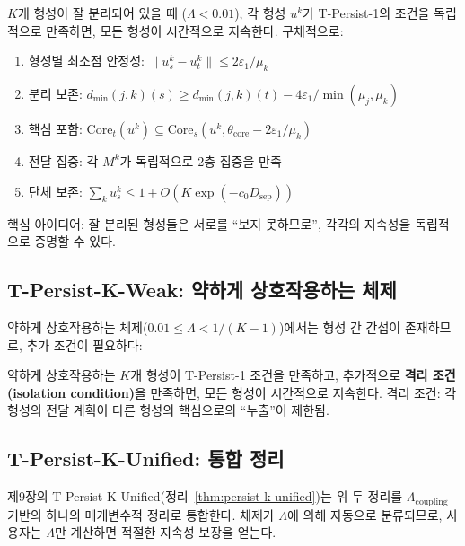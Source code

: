 \begin{theorem}
\label{thm:persist-k-sep}
$K$개 형성이 잘 분리되어 있을 때 ($\Lambda < 0.01$), 각 형성 $u^k$가 T-Persist-1의 조건을 독립적으로 만족하면, 모든 형성이 시간적으로 지속한다. 구체적으로:
\begin{enumerate}
    \item[(a)] 형성별 최소점 안정성: $\|u^k_s - u^k_t\| \leq 2\varepsilon_1/\mu_k$
    \item[(b)] 분리 보존: $d_{\min}(j,k)(s) \geq d_{\min}(j,k)(t) - 4\varepsilon_1/\min(\mu_j, \mu_k)$
    \item[(c)] 핵심 포함: $\mathrm{Core}_t(u^k) \subseteq \mathrm{Core}_s(u^k, \theta_{\mathrm{core}} - 2\varepsilon_1/\mu_k)$
    \item[(d)] 전달 집중: 각 $M^k$가 독립적으로 2층 집중을 만족
    \item[(e)] 단체 보존: $\sum_k u^k_s \leq 1 + O(K \exp(-c_0 D_{\mathrm{sep}}))$
\end{enumerate}
\end{theorem}

핵심 아이디어: 잘 분리된 형성들은 서로를 ``보지 못하므로'', 각각의 지속성을 독립적으로 증명할 수 있다.

\subsection{T-Persist-K-Weak: 약하게 상호작용하는 체제}

약하게 상호작용하는 체제($0.01 \leq \Lambda < 1/(K-1)$)에서는 형성 간 간섭이 존재하므로, 추가 조건이 필요하다:

\begin{theorem}
\label{thm:persist-k-weak}
약하게 상호작용하는 $K$개 형성이 T-Persist-1 조건을 만족하고, 추가적으로 \textbf{격리 조건(isolation condition)}을 만족하면, 모든 형성이 시간적으로 지속한다. 격리 조건: 각 형성의 전달 계획이 다른 형성의 핵심으로의 ``누출''이 제한됨.
\end{theorem}

\subsection{T-Persist-K-Unified: 통합 정리}

제9장의 T-Persist-K-Unified(정리~\ref{thm:persist-k-unified})는 위 두 정리를 $\Lambda_{\mathrm{coupling}}$ 기반의 하나의 매개변수적 정리로 통합한다. 체제가 $\Lambda$에 의해 자동으로 분류되므로, 사용자는 $\Lambda$만 계산하면 적절한 지속성 보장을 얻는다.

